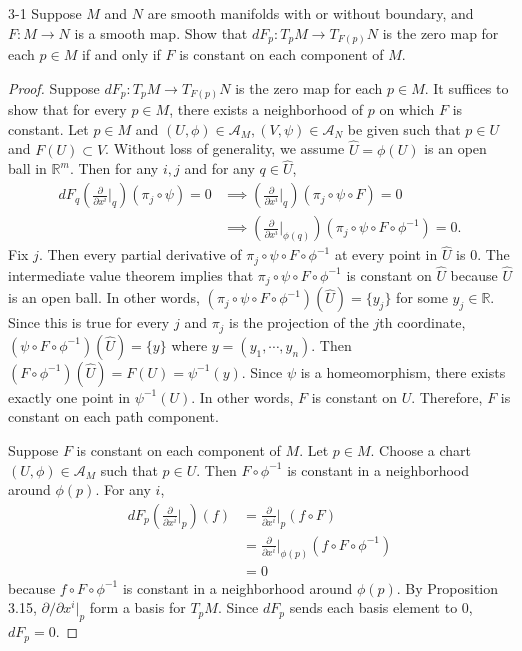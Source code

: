 \begin{customprob}{3-1}
  Suppose $M$ and $N$ are smooth manifolds with or without boundary, and $F: M \rightarrow N$ is a smooth map.
  Show that $dF_p: T_pM \rightarrow T_{F(p)}N$ is the zero map for each $p \in M$ if and only if $F$ is constant on each component of $M$.
\end{customprob}

\begin{proof}
  Suppose $dF_p: T_pM \rightarrow T_{F(p)}N$ is the zero map for each $p \in M$.
  It suffices to show that for every $p \in M$, there exists a neighborhood of $p$ on which $F$ is constant.
  Let $p \in M$ and $(U, \phi) \in \mathcal{A}_M, (V, \psi) \in \mathcal{A}_N$ be given such that $p \in U$ and $F(U) \subset V$.
  Without loss of generality, we assume $\hat{U} = \phi(U)$ is an open ball in $\mathbb{R}^m$.
  Then for any $i, j$ and for any $q \in \hat{U}$,
  \begin{align*}
    dF_q(\frac{\partial}{\partial x^i}\vert_q)(\pi_j \circ \psi) = 0
      &\implies (\frac{\partial}{\partial x^i}\vert_q)(\pi_j \circ \psi \circ F) = 0 \\
      &\implies (\frac{\partial}{\partial x^i}\vert_{\phi(q)})(\pi_j \circ \psi \circ F \circ \phi^{-1}) = 0.
  \end{align*}
  Fix $j$.
  Then every partial derivative of $\pi_j \circ \psi \circ F \circ \phi^{-1}$ at every point in $\hat{U}$ is 0.
  The intermediate value theorem implies that $\pi_j \circ \psi \circ F \circ \phi^{-1}$ is constant on $\hat{U}$ because $\hat{U}$ is an open ball.
  In other words, $(\pi_j \circ \psi \circ F \circ \phi^{-1})(\hat{U}) = \{ y_j \}$ for some $y_j \in \mathbb{R}$.
  Since this is true for every $j$ and $\pi_j$ is the projection of the $j$th coordinate, $(\psi \circ F \circ \phi^{-1})(\hat{U}) = \{ y \}$ where $y = (y_1, \cdots, y_n)$.
  Then $(F \circ \phi^{-1})(\hat{U}) = F(U) = \psi^{-1}(y)$.
  Since $\psi$ is a homeomorphism, there exists exactly one point in $\psi^{-1}(U)$.
  In other words, $F$ is constant on $U$.
  Therefore, $F$ is constant on each path component.

  Suppose $F$ is constant on each component of $M$.
  Let $p \in M$.
  Choose a chart $(U, \phi) \in \mathcal{A}_M$ such that $p \in U$.
  Then $F \circ \phi^{-1}$ is constant in a neighborhood around $\phi(p)$.
  For any $i$,
  \begin{align*}
    dF_p(\frac{\partial}{\partial x^i}\vert_p)(f)
      &= \frac{\partial}{\partial x^i}\vert_p(f \circ F) \\
      &= \frac{\partial}{\partial x^i}\vert_{\phi(p)}(f \circ F \circ \phi^{-1}) \\
      &= 0
  \end{align*}
  because $f \circ F \circ \phi^{-1}$ is constant in a neighborhood around $\phi(p)$.
  By Proposition 3.15, $\partial / \partial x^i\vert_p$ form a basis for $T_pM$.
  Since $dF_p$ sends each basis element to 0, $dF_p = 0$.
\end{proof}

